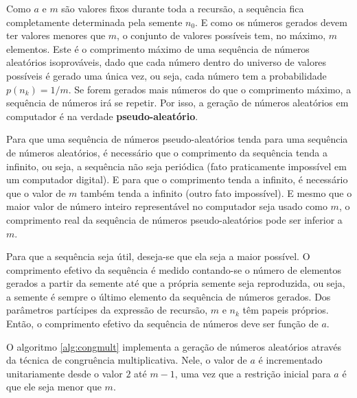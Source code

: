 \documentclass[a4paper,12pt,oneside,onecolumn]{uerj}
\begin{document}
\noindent Como $a$ e $m$ são valores fixos durante toda a recursão, a sequência fica completamente determinada pela semente $n_0$. E como os números gerados devem ter valores menores que $m$, o conjunto de valores possíveis tem, no máximo, $m$ elementos. Este é o comprimento máximo de uma sequência de números aleatórios isoprováveis, dado que cada número dentro do universo de valores possíveis é gerado uma única vez, ou seja, cada número tem a probabilidade $p(n_k) = 1/m$. Se forem gerados mais números do que o comprimento máximo, a sequência de números irá se repetir. Por isso, a geração de números aleatórios em computador é na verdade \textbf{pseudo-aleatório}.

Para que uma sequência de números pseudo-aleatórios tenda para uma sequência de números aleatórios, é necessário que o comprimento da sequência tenda a infinito, ou seja, a sequência não seja periódica (fato praticamente impossível em um computador digital). E para que o comprimento tenda a infinito, é necessário que o valor de $m$ também tenda a infinito (outro fato impossível). E mesmo que o maior valor de número inteiro representável no computador seja usado como $m$, o comprimento real da sequência de números pseudo-aleatórios pode ser inferior a $m$.

Para que a sequência seja útil, deseja-se que ela seja a maior possível. O comprimento efetivo da sequência é medido contando-se o número de elementos gerados a partir da semente até que a própria semente seja reproduzida, ou seja, a semente é sempre o último elemento da sequência de números gerados. Dos parâmetros partícipes da expressão de recursão, $m$ e $n_k$ têm papeis próprios. Então, o comprimento efetivo da sequência de números deve ser função de $a$.

O algoritmo \ref{alg:congmult} implementa a geração de números aleatórios através da técnica de congruência multiplicativa. Nele, o valor de $a$ é incrementado unitariamente desde o valor $2$ até $m-1$, uma vez que a restrição inicial para $a$ é que ele seja menor que $m$.
\end{document}
